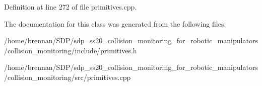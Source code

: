 Definition at line 272 of file primitives.\+cpp.



The documentation for this class was generated from the following files\+:\begin{DoxyCompactItemize}
\item 
/home/brennan/\+S\+D\+P/sdp\+\_\+ss20\+\_\+collision\+\_\+monitoring\+\_\+for\+\_\+robotic\+\_\+manipulators/collision\+\_\+monitoring/include/primitives.\+h\item 
/home/brennan/\+S\+D\+P/sdp\+\_\+ss20\+\_\+collision\+\_\+monitoring\+\_\+for\+\_\+robotic\+\_\+manipulators/collision\+\_\+monitoring/src/primitives.\+cpp\end{DoxyCompactItemize}
